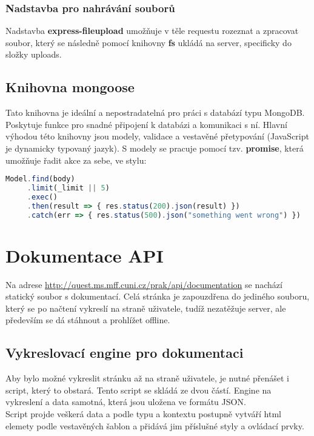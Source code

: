 \subsubsection{Nadstavba pro nahrávání souborů}
Nadstavba \textbf{express-fileupload} umožňuje v těle requestu rozeznat a zpracovat soubor, který
se následně pomocí knihovny \textbf{fs} ukládá na server, specificky do složky uploads.

\subsection{Knihovna mongoose}
Tato knihovna je ideální a nepostradatelná pro práci s databází typu MongoDB.
Poskytuje funkce pro snadné připojení k databázi a komunikaci s ní.
Hlavní výhodou této knihovny jsou modely, validace a vestavěné přetypování
(JavaScript je dynamicky typovaný jazyk). 
S modely se pracuje pomocí tzv. \textbf{promise}, která umožňuje řadit
akce za sebe, ve stylu:
\begin{lstlisting}[language=JavaScript]
Model.find(body)
     .limit(_limit || 5)
     .exec()
     .then(result => { res.status(200).json(result) })
     .catch(err => { res.status(500).json("something went wrong") })
\end{lstlisting}

\section{Dokumentace API}
Na adrese \url{http://quest.ms.mff.cuni.cz/prak/api/documentation} se nachází statický soubor s dokumentací.
Celá stránka je zapouzdřena do jediného souboru, který se po načtení 
vykreslí na straně uživatele, tudíž nezatěžuje server, ale
především se dá stáhnout a prohlížet offline.

\subsection{Vykreslovací engine pro dokumentaci}
Aby bylo možné vykreslit stránku až na straně uživatele,
je nutné přenášet i script, který to obstará. Tento script se skládá ze dvou částí.
Engine na vykreslení a data samotná, která jsou uložena ve formátu JSON.\\
Script projde veškerá data a podle typu a kontextu postupně vytváří
html elemety podle vestavěných šablon a přidává jim příslušné styly a ovládací prvky.


